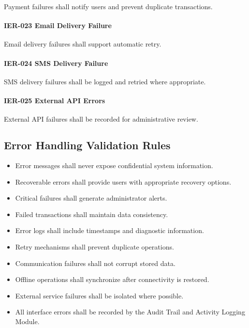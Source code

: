 Payment failures shall notify users and prevent duplicate transactions.

\paragraph{IER-023 Email Delivery Failure}

Email delivery failures shall support automatic retry.

\paragraph{IER-024 SMS Delivery Failure}

SMS delivery failures shall be logged and retried where appropriate.

\paragraph{IER-025 External API Errors}

External API failures shall be recorded for administrative review.


\subsection*{Error Handling Validation Rules}

\begin{itemize}

\item Error messages shall never expose confidential system
information.

\item Recoverable errors shall provide users with appropriate recovery
options.

\item Critical failures shall generate administrator alerts.

\item Failed transactions shall maintain data consistency.

\item Error logs shall include timestamps and diagnostic information.

\item Retry mechanisms shall prevent duplicate operations.

\item Communication failures shall not corrupt stored data.

\item Offline operations shall synchronize after connectivity is
restored.

\item External service failures shall be isolated where possible.

\item All interface errors shall be recorded by the Audit Trail and
Activity Logging Module.

\end{itemize}

